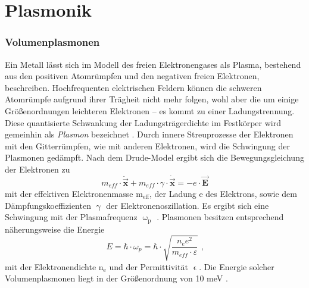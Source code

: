 \section{Plasmonik}
\subsubsection{Volumenplasmonen}
Ein Metall lässt sich im Modell des freien Elektronengases als Plasma, bestehend aus den positiven Atomrümpfen und den negativen freien Elektronen, beschreiben. Hochfrequenten elektrischen Feldern können die schweren Atomrümpfe aufgrund ihrer Trägheit nicht mehr folgen, wohl aber die um einige Größenordnungen leichteren Elektronen – es kommt zu einer Ladungstrennung. Diese quantisierte Schwankung der Ladungsträgerdichte im Festkörper wird gemeinhin als \textit{Plasmon} bezeichnet \cite{Gross.2014}. Durch innere Streuprozesse der Elektronen mit den Gitterrümpfen, wie mit anderen Elektronen, wird die Schwingung der Plasmonen gedämpft. Nach dem Drude-Model ergibt sich die Bewegungsgleichung der Elektronen zu
\begin{equation}
m_{eff}\cdot \ddot{\vec{\textbf{x}}} + m_{eff} \cdot \gamma \cdot \dot{\vec{\textbf{x}}}=-e \cdot \vec{\textbf{E}}
\end{equation}
mit der effektiven Elektronenmasse $\text{m}_\text{eff}$, der Ladung e des Elektrons, sowie dem Dämpfungskoeffizienten $\upgamma$ der Elektronenoszillation. Es ergibt sich eine Schwingung mit der Plasmafrequenz $\upomega_\text{p}$ \cite{Maier.2010}. Plasmonen besitzen entsprechend näherungsweise die Energie
\begin{equation}
E=\hbar \cdot \omega_p=\hbar \cdot \sqrt{\frac{n_e e^2}{m_{eff} \cdot \varepsilon}} \text{ ,}
\end{equation}
mit der Elektronendichte $\text{n}_\text{e}$ und der Permittivität $\upvarepsilon$. Die Energie solcher Volumenplasmonen liegt in der Größenordnung von 10 meV \cite{Gross.2014}.
